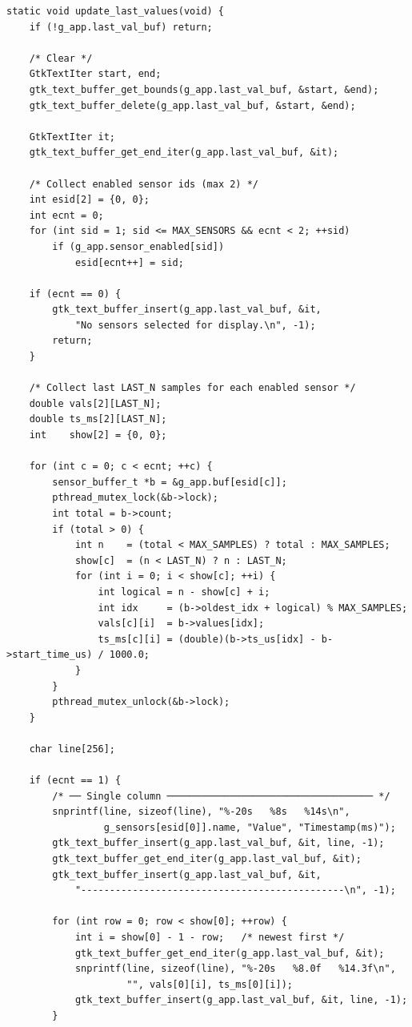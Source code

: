 \begin{verbatim}
static void update_last_values(void) {
    if (!g_app.last_val_buf) return;

    /* Clear */
    GtkTextIter start, end;
    gtk_text_buffer_get_bounds(g_app.last_val_buf, &start, &end);
    gtk_text_buffer_delete(g_app.last_val_buf, &start, &end);

    GtkTextIter it;
    gtk_text_buffer_get_end_iter(g_app.last_val_buf, &it);

    /* Collect enabled sensor ids (max 2) */
    int esid[2] = {0, 0};
    int ecnt = 0;
    for (int sid = 1; sid <= MAX_SENSORS && ecnt < 2; ++sid)
        if (g_app.sensor_enabled[sid])
            esid[ecnt++] = sid;

    if (ecnt == 0) {
        gtk_text_buffer_insert(g_app.last_val_buf, &it,
            "No sensors selected for display.\n", -1);
        return;
    }

    /* Collect last LAST_N samples for each enabled sensor */
    double vals[2][LAST_N];
    double ts_ms[2][LAST_N];
    int    show[2] = {0, 0};

    for (int c = 0; c < ecnt; ++c) {
        sensor_buffer_t *b = &g_app.buf[esid[c]];
        pthread_mutex_lock(&b->lock);
        int total = b->count;
        if (total > 0) {
            int n    = (total < MAX_SAMPLES) ? total : MAX_SAMPLES;
            show[c]  = (n < LAST_N) ? n : LAST_N;
            for (int i = 0; i < show[c]; ++i) {
                int logical = n - show[c] + i;
                int idx     = (b->oldest_idx + logical) % MAX_SAMPLES;
                vals[c][i]  = b->values[idx];
                ts_ms[c][i] = (double)(b->ts_us[idx] - b->start_time_us) / 1000.0;
            }
        }
        pthread_mutex_unlock(&b->lock);
    }

    char line[256];

    if (ecnt == 1) {
        /* ── Single column ──────────────────────────────────── */
        snprintf(line, sizeof(line), "%-20s   %8s   %14s\n",
                 g_sensors[esid[0]].name, "Value", "Timestamp(ms)");
        gtk_text_buffer_insert(g_app.last_val_buf, &it, line, -1);
        gtk_text_buffer_get_end_iter(g_app.last_val_buf, &it);
        gtk_text_buffer_insert(g_app.last_val_buf, &it,
            "----------------------------------------------\n", -1);

        for (int row = 0; row < show[0]; ++row) {
            int i = show[0] - 1 - row;   /* newest first */
            gtk_text_buffer_get_end_iter(g_app.last_val_buf, &it);
            snprintf(line, sizeof(line), "%-20s   %8.0f   %14.3f\n",
                     "", vals[0][i], ts_ms[0][i]);
            gtk_text_buffer_insert(g_app.last_val_buf, &it, line, -1);
        }


\end{verbatim}
